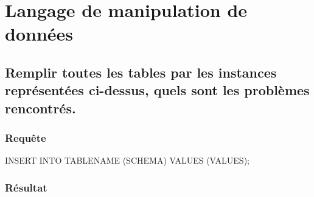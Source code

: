 \documentclass[•]{article}
\begin{document}
\section{Langage de manipulation de données}
\subsection{Remplir toutes les tables par les instances représentées ci-dessus, quels sont les problèmes rencontrés.}
\subsubsection{Requête}
\begin{sql}
INSERT INTO TABLENAME (SCHEMA) VALUES (VALUES);
\end{sql}
\subsubsection{Résultat}
\end{document}
